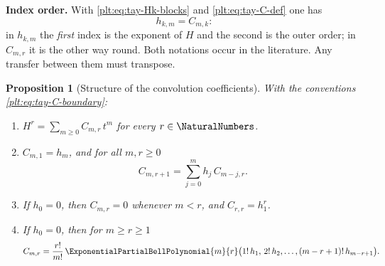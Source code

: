 \documentclass[11pt,oneside]{article}
\theoremstyle{plain}
\newtheorem{proposition}[theorem]{Proposition}
\theoremstyle{definition}
\theoremstyle{remark}
\begin{document}
\begin{warningbox}
\textbf{Index order.}  With \eqref{plt:eq:tay-Hk-blocks} and
\eqref{plt:eq:tay-C-def} one has
\[
 h_{k,m}=C_{m,k}:
\]
in \(h_{k,m}\) the \emph{first} index is the exponent of \(H\) and the second
is the outer order; in \(C_{m,r}\) it is the other way round.  Both notations
occur in the literature.  Any transfer between them must transpose.
\end{warningbox}

\begin{proposition}[Structure of the convolution coefficients]
\label{plt:prop:tay-convolution}
With the conventions \eqref{plt:eq:tay-C-boundary}:
\begin{enumerate}
\item \(H^{r}=\sum_{m\ge0}C_{m,r}\,t^{m}\) for every \(r\in\NaturalNumbers\).
\item \(C_{m,1}=h_{m}\), and for all \(m,r\ge0\)
\begin{equation}\label{plt:eq:tay-C-recurrence}
 C_{m,r+1}=\sum_{j=0}^{m}h_{j}\,C_{m-j,r}.
\end{equation}
\item If \(h_{0}=0\), then \(C_{m,r}=0\) whenever \(m<r\), and
\(C_{r,r}=h_{1}^{r}\).
\item If \(h_{0}=0\), then for \(m\ge r\ge1\)
\begin{equation}\label{plt:eq:tay-C-bell}
 C_{m,r}
 =\frac{r!}{m!}\,
  \ExponentialPartialBellPolynomial{m}{r}
   \bigl(1!\,h_{1},\,2!\,h_{2},\ldots,(m-r+1)!\,h_{m-r+1}\bigr).
\end{equation}
\end{enumerate}
\end{proposition}
\end{document}
